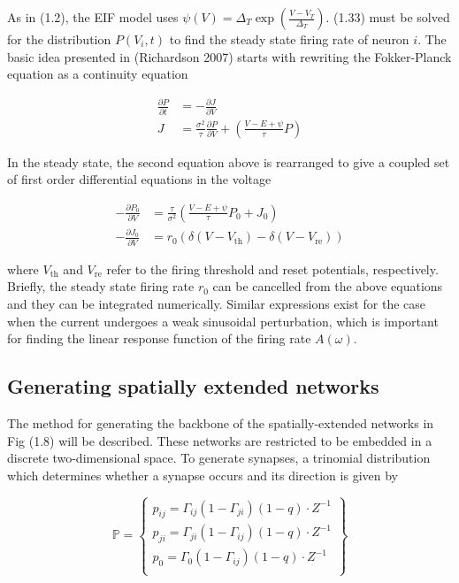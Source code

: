 \documentclass{ucetd}
\begin{document}
As in (1.2), the EIF model uses $\psi(V) = \Delta_{T}\exp\left(\frac{V-V_{T}}{\Delta_{T}}\right)$. (1.33) must be solved for the distribution $P(V_{i},t)$ to find the steady state firing rate of neuron $i$. The basic idea presented in (Richardson 2007) starts with rewriting the Fokker-Planck equation as a continuity equation

\begin{align*}
\frac{\partial P}{\partial t} &= -\frac{\partial J}{\partial V}\\
J &= \frac{\sigma^{2}}{\tau}\frac{\partial P}{\partial V} + \left(\frac{V-E+\psi}{\tau}P\right)
\end{align*}

In the steady state, the second equation above is rearranged to give a coupled set of first order differential equations in the voltage

\begin{align*}
-\frac{\partial P_{0}}{\partial V} &= \frac{\tau}{\sigma^{2}}\left(\frac{V-E+\psi}{\tau}P_{0} + J_{0}\right)\\
-\frac{\partial J_{0}}{\partial V} &= r_{0}\left(\delta(V-V_{\mathrm{th}}) - \delta(V-V_{\mathrm{re}})\right)
\end{align*}

where $V_{\mathrm{th}}$ and $V_{\mathrm{re}}$ refer to the firing threshold and reset potentials, respectively. Briefly, the steady state firing rate $r_{0}$ can be cancelled from the above equations and they can be integrated numerically. Similar expressions exist for the case when the current undergoes a weak sinusoidal perturbation, which is important for finding the linear response function of the firing rate $A(\omega)$. 


\subsection{Generating spatially extended networks}

The method for generating the backbone of the spatially-extended networks in Fig (1.8) will be described. These networks are restricted to be embedded in a discrete two-dimensional space. To generate synapses, a trinomial distribution which determines whether a synapse occurs and its direction is given by

\begin{equation}
    \mathbb{P} = \left\{\begin{array}{lr}
        p_{ij} = \Gamma_{ij}(1-\Gamma_{ji})(1-q)\cdot Z^{-1}\\
        p_{ji} = \Gamma_{ji}(1-\Gamma_{ij})(1-q)\cdot Z^{-1}\\
        p_{0} = \Gamma_{0}(1-\Gamma_{ij})(1-q)\cdot Z^{-1}\\
        \end{array}\right\}
\end{equation}
\end{document}
